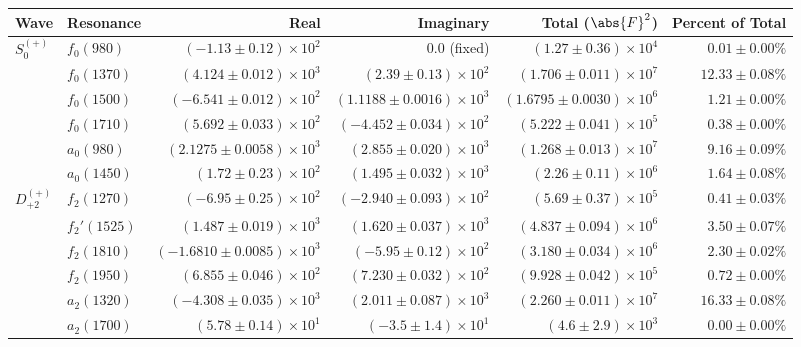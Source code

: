 \begin{table}[ht]
    \begin{center}
        \begin{tabular}{llrrrr}\toprule
        Wave & Resonance & Real & Imaginary & Total ($\abs{F}^2$) & Percent of Total \\\midrule
$S_{0}^{(+)}$ & $f_{0}(980)$ & $(-1.13 \pm 0.12) \times 10^{2}$ & $0.0$ (fixed) & $(1.27 \pm 0.36) \times 10^{4}$ & $0.01 \pm 0.00 \%$ \\
 & $f_{0}(1370)$ & $(4.124 \pm 0.012) \times 10^{3}$ & $(2.39 \pm 0.13) \times 10^{2}$ & $(1.706 \pm 0.011) \times 10^{7}$ & $12.33 \pm 0.08 \%$ \\
 & $f_{0}(1500)$ & $(-6.541 \pm 0.012) \times 10^{2}$ & $(1.1188 \pm 0.0016) \times 10^{3}$ & $(1.6795 \pm 0.0030) \times 10^{6}$ & $1.21 \pm 0.00 \%$ \\
 & $f_{0}(1710)$ & $(5.692 \pm 0.033) \times 10^{2}$ & $(-4.452 \pm 0.034) \times 10^{2}$ & $(5.222 \pm 0.041) \times 10^{5}$ & $0.38 \pm 0.00 \%$ \\
 & $a_{0}(980)$ & $(2.1275 \pm 0.0058) \times 10^{3}$ & $(2.855 \pm 0.020) \times 10^{3}$ & $(1.268 \pm 0.013) \times 10^{7}$ & $9.16 \pm 0.09 \%$ \\
 & $a_{0}(1450)$ & $(1.72 \pm 0.23) \times 10^{2}$ & $(1.495 \pm 0.032) \times 10^{3}$ & $(2.26 \pm 0.11) \times 10^{6}$ & $1.64 \pm 0.08 \%$ \\
$D_{+2}^{(+)}$ & $f_{2}(1270)$ & $(-6.95 \pm 0.25) \times 10^{2}$ & $(-2.940 \pm 0.093) \times 10^{2}$ & $(5.69 \pm 0.37) \times 10^{5}$ & $0.41 \pm 0.03 \%$ \\
 & $f_{2}'(1525)$ & $(1.487 \pm 0.019) \times 10^{3}$ & $(1.620 \pm 0.037) \times 10^{3}$ & $(4.837 \pm 0.094) \times 10^{6}$ & $3.50 \pm 0.07 \%$ \\
 & $f_{2}(1810)$ & $(-1.6810 \pm 0.0085) \times 10^{3}$ & $(-5.95 \pm 0.12) \times 10^{2}$ & $(3.180 \pm 0.034) \times 10^{6}$ & $2.30 \pm 0.02 \%$ \\
 & $f_{2}(1950)$ & $(6.855 \pm 0.046) \times 10^{2}$ & $(7.230 \pm 0.032) \times 10^{2}$ & $(9.928 \pm 0.042) \times 10^{5}$ & $0.72 \pm 0.00 \%$ \\
 & $a_{2}(1320)$ & $(-4.308 \pm 0.035) \times 10^{3}$ & $(2.011 \pm 0.087) \times 10^{3}$ & $(2.260 \pm 0.011) \times 10^{7}$ & $16.33 \pm 0.08 \%$ \\
 & $a_{2}(1700)$ & $(5.78 \pm 0.14) \times 10^{1}$ & $(-3.5 \pm 1.4) \times 10^{1}$ & $(4.6 \pm 2.9) \times 10^{3}$ & $0.00 \pm 0.00 \%$ \\

\end{tabular}
\end{center}
\end{table}
